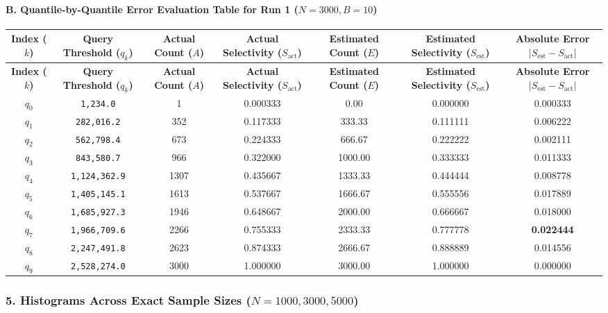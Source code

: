 \documentclass[11pt,a4paper]{article}
\begin{document}
\paragraph{B. Quantile-by-Quantile Error Evaluation Table for Run 1 ($N=3000, B=10$)}
{\begingroup
\footnotesize
\setlength{\tabcolsep}{3.5pt}
\begin{xltabular}{\textwidth}{C | C | C | C | C | C | C}
\toprule
\textbf{Index ($k$)} & \textbf{Query Threshold ($q_k$)} & \textbf{Actual Count ($A$)} & \textbf{Actual Selectivity ($S_{\text{act}}$)} & \textbf{Estimated Count ($E$)} & \textbf{Estimated Selectivity ($S_{\text{est}}$)} & \textbf{Absolute Error $\vert S_{\text{est}} - S_{\text{act}} \vert$} \\
\midrule
\endfirsthead
\toprule
\textbf{Index ($k$)} & \textbf{Query Threshold ($q_k$)} & \textbf{Actual Count ($A$)} & \textbf{Actual Selectivity ($S_{\text{act}}$)} & \textbf{Estimated Count ($E$)} & \textbf{Estimated Selectivity ($S_{\text{est}}$)} & \textbf{Absolute Error $\vert S_{\text{est}} - S_{\text{act}} \vert$} \\
\midrule
\endfirsthead
\endhead
\bottomrule
\endfoot
\bottomrule
\endlastfoot
$q_{0}$ & \texttt{1,234.0} & 1 & 0.000333 & 0.00 & 0.000000 & 0.000333 \\
$q_{1}$ & \texttt{282,016.2} & 352 & 0.117333 & 333.33 & 0.111111 & 0.006222 \\
$q_{2}$ & \texttt{562,798.4} & 673 & 0.224333 & 666.67 & 0.222222 & 0.002111 \\
$q_{3}$ & \texttt{843,580.7} & 966 & 0.322000 & 1000.00 & 0.333333 & 0.011333 \\
$q_{4}$ & \texttt{1,124,362.9} & 1307 & 0.435667 & 1333.33 & 0.444444 & 0.008778 \\
$q_{5}$ & \texttt{1,405,145.1} & 1613 & 0.537667 & 1666.67 & 0.555556 & 0.017889 \\
$q_{6}$ & \texttt{1,685,927.3} & 1946 & 0.648667 & 2000.00 & 0.666667 & 0.018000 \\
$q_{7}$ & \texttt{1,966,709.6} & 2266 & 0.755333 & 2333.33 & 0.777778 & \textbf{0.022444} \\
$q_{8}$ & \texttt{2,247,491.8} & 2623 & 0.874333 & 2666.67 & 0.888889 & 0.014556 \\
$q_{9}$ & \texttt{2,528,274.0} & 3000 & 1.000000 & 3000.00 & 1.000000 & 0.000000 \\
\end{xltabular}
\endgroup}


\subsubsection{5. Histograms Across Exact Sample Sizes ($N = 1000, 3000, 5000$)}
\end{document}
